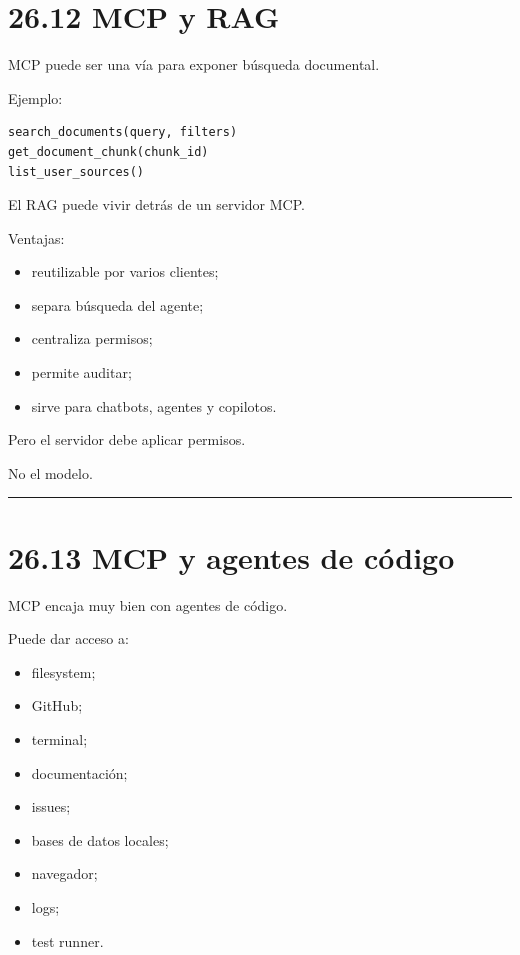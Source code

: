 \section{26.12 MCP y RAG}\label{mcp-y-rag}

MCP puede ser una vía para exponer búsqueda documental.

Ejemplo:

\begin{lstlisting}
search_documents(query, filters)
get_document_chunk(chunk_id)
list_user_sources()
\end{lstlisting}

El RAG puede vivir detrás de un servidor MCP.

Ventajas:

\begin{itemize}
\tightlist
\item
  reutilizable por varios clientes;
\item
  separa búsqueda del agente;
\item
  centraliza permisos;
\item
  permite auditar;
\item
  sirve para chatbots, agentes y copilotos.
\end{itemize}

Pero el servidor debe aplicar permisos.

No el modelo.

\begin{center}\rule{0.5\linewidth}{0.5pt}\end{center}

\section{26.13 MCP y agentes de
código}\label{mcp-y-agentes-de-cuxf3digo}

MCP encaja muy bien con agentes de código.

Puede dar acceso a:

\begin{itemize}
\tightlist
\item
  filesystem;
\item
  GitHub;
\item
  terminal;
\item
  documentación;
\item
  issues;
\item
  bases de datos locales;
\item
  navegador;
\item
  logs;
\item
  test runner.
\end{itemize}

